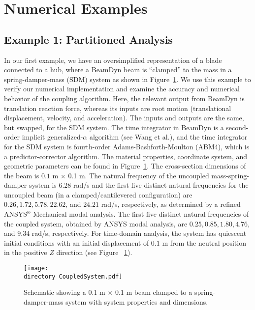 \documentclass{aiaa-tc}
\def\directory{EPSF/}
\begin{document}
 
\section{Numerical Examples}
 
\subsection{Example 1: Partitioned Analysis}

In our first example, we have an oversimplified representation of a blade connected to a hub, where
a BeamDyn beam is ``clamped'' to the mass in a spring-damper-mass (SDM) system as shown in Figure~\ref{fig:CoupledSystem}.     
We use this example to verify our numerical implementation and examine the accuracy and numerical behavior of the coupling algorithm. 
Here, the relevant output from BeamDyn is translation reaction force, whereas its inputs are root motion (translational displacement, velocity, and acceleration).  
The inputs and outputs are the same, but swapped, for the SDM system.
The time integrator in BeamDyn is a second-order implicit generalized-$\alpha$ algorithm (see Wang et al.\cite{Wang:GEBT2014}), and the time integrator for the SDM system is fourth-order Adams-Bashforth-Moulton (ABM4), which is a predictor-corrector algorithm.
The material properties, coordinate system, and geometric parameters can be found in Figure~\ref{fig:CoupledSystem}. 
The cross-section dimensions of the beam is $0.1$ m $\times$ 0.1 m. 
The natural frequency of the uncoupled mass-spring-damper system is $6.28$ rad/s and the first five distinct natural frequencies for the uncoupled beam (in a clamped/cantilevered configuration) are $0.26, 1.72, 5.78, 22.62$, and $24.21$ rad/s, respectively, as determined by a refined ANSYS$^{\circledR}$ Mechanical modal analysis. 
The first five distinct natural frequencies of the coupled system, obtained by ANSYS modal analysis, are $0.25, 0.85, 1.80, 4.76$, and $9.34$ rad/s, respectively.
For time-domain analysis, the system has quiescent initial conditions with an initial displacement of $0.1$ m from the neutral position in the positive $Z$ direction (see Figure ~\ref{fig:CoupledSystem}). 

\begin{figure}
\centering
\texttt{[image: \\directory CoupledSystem.pdf]}
\caption{Schematic showing a 0.1 m $\times$ 0.1 m beam clamped to a spring-damper-mass system with system properties and dimensions.} 
\label{fig:CoupledSystem}
\end{figure}
 
\end{document}

